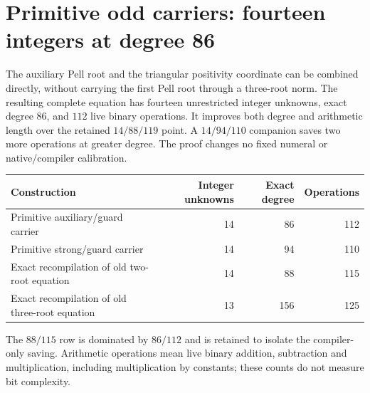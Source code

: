 \section{Primitive odd carriers: fourteen integers at degree 86}
\label{sec:root-primitives}

The auxiliary Pell root and the triangular positivity coordinate can be
combined directly, without carrying the first Pell root through a three-root
norm. The resulting complete equation has fourteen unrestricted integer
unknowns, exact degree $86$, and $112$ live binary operations. It improves
both degree and arithmetic length over the retained $14/88/119$ point.
A $14/94/110$ companion saves two more operations at greater degree.
The proof changes no fixed numeral or native/compiler calibration.

\begin{center}\small
\begin{tabular}{lrrr}
Construction & Integer unknowns & Exact degree & Operations\\\hline
Primitive auxiliary/guard carrier &14&86&112\\
Primitive strong/guard carrier &14&94&110\\
Exact recompilation of old two-root equation &14&88&115\\
Exact recompilation of old three-root equation &13&156&125
\end{tabular}
\end{center}
The $88/115$ row is dominated by $86/112$ and is retained to isolate the
compiler-only saving. Arithmetic operations mean live binary addition,
subtraction and multiplication, including multiplication by constants;
these counts do not measure bit complexity.

